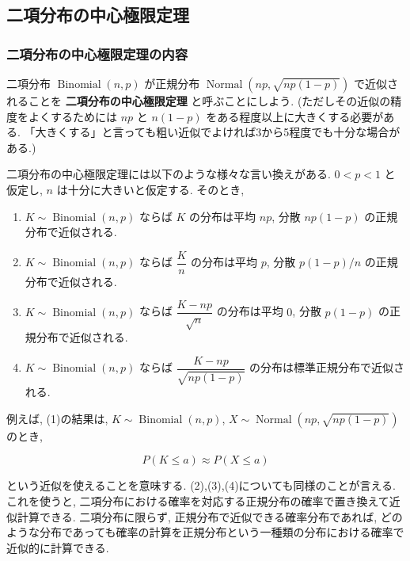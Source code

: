 \documentclass[10pt, a4paper,xelatex,ja=standard]{bxjsarticle}
\newcommand\op{\operatorname}
\begin{document}
    \hypertarget{ux4e8cux9805ux5206ux5e03ux306eux4e2dux5fc3ux6975ux9650ux5b9aux7406}{%
\subsection{二項分布の中心極限定理}\label{ux4e8cux9805ux5206ux5e03ux306eux4e2dux5fc3ux6975ux9650ux5b9aux7406}}

    \hypertarget{ux4e8cux9805ux5206ux5e03ux306eux4e2dux5fc3ux6975ux9650ux5b9aux7406ux306eux5185ux5bb9}{%
\subsubsection{二項分布の中心極限定理の内容}\label{ux4e8cux9805ux5206ux5e03ux306eux4e2dux5fc3ux6975ux9650ux5b9aux7406ux306eux5185ux5bb9}}

二項分布 \(\op{Binomial}(n, p)\) が正規分布
\(\op{Normal}\left(np, \sqrt{np(1-p)}\right)\) で近似されることを
\textbf{二項分布の中心極限定理} と呼ぶことにしよう.
(ただしその近似の精度をよくするためには \(np\) と \(n(1-p)\)
をある程度以上に大きくする必要がある.
「大きくする」と言っても粗い近似でよければ3から5程度でも十分な場合がある.)

二項分布の中心極限定理には以下のような様々な言い換えがある. \(0<p<1\)
と仮定し, \(n\) は十分に大きいと仮定する. そのとき,

\begin{enumerate}
\def\labelenumi{(\arabic{enumi})}
\item
  \(K\sim\op{Binomial}(n, p)\) ならば \(K\) の分布は平均 \(np\), 分散
  \(np(1-p)\) の正規分布で近似される.
\item
  \(K\sim\op{Binomial}(n, p)\) ならば \(\dfrac{K}{n}\) の分布は平均
  \(p\), 分散 \(p(1-p)/n\) の正規分布で近似される.
\item
  \(K\sim\op{Binomial}(n, p)\) ならば \(\dfrac{K-np}{\sqrt{n}}\)
  の分布は平均 \(0\), 分散 \(p(1-p)\) の正規分布で近似される.
\item
  \(K\sim\op{Binomial}(n, p)\) ならば \(\dfrac{K-np}{\sqrt{np(1-p)}}\)
  の分布は標準正規分布で近似される.
\end{enumerate}

例えば, (1)の結果は, \(K\sim\op{Binomial}(n, p)\),
\(X\sim \op{Normal}\left(np, \sqrt{np(1-p)}\right)\) のとき,

\[
P(K \le a) \approx P(X \le a)
\]

という近似を使えることを意味する.
(2),(3),(4)についても同様のことが言える. これを使うと,
二項分布における確率を対応する正規分布の確率で置き換えて近似計算できる.
二項分布に限らず, 正規分布で近似できる確率分布であれば,
どのような分布であっても確率の計算を正規分布という一種類の分布における確率で近似的に計算できる.
\end{document}
